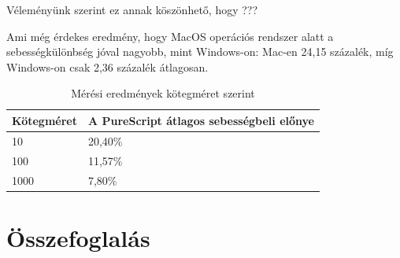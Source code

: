 \documentclass[12pt]{article}
\newtheorem{definíció}[theorem]{Definíció}
\begin{document}
Véleményünk szerint ez annak köszönhető, hogy ???

Ami még érdekes eredmény, hogy MacOS operációs rendszer alatt a sebességkülönbség jóval nagyobb, mint Windows-on: Mac-en 24,15 százalék, míg Windows-on csak 2,36 százalék átlagosan.

\begin{table}[h!]
\centering
\begin{tabular}{ |p{3.2cm}|p{6cm}| } 
\hline
 \textbf{Kötegméret} &\textbf{A PureScript átlagos sebességbeli előnye}\\
\hline10&20,40\%\\
\hline
100& 11,57\%\\
\hline
1000& 7,80\%\\
\hline
\end{tabular}
\caption{Mérési eredmények kötegméret szerint}
\end{table}


\newpage
\section*{Összefoglalás}





\end{document}
